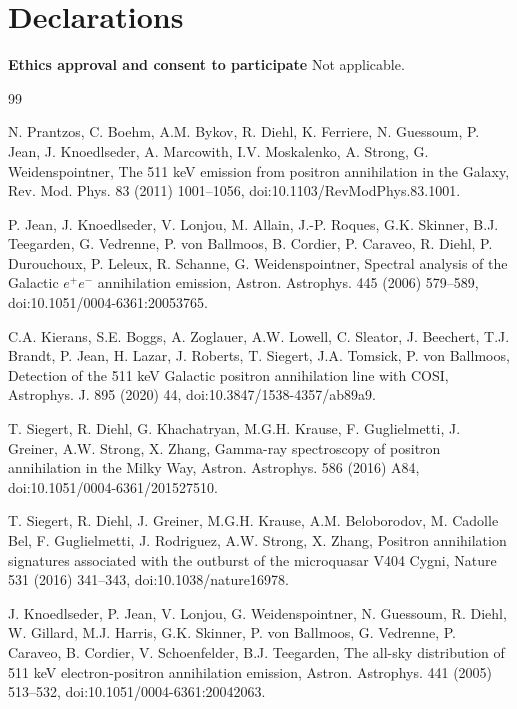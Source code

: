 \documentclass[11pt]{article}
\begin{document}
\section*{Declarations}
\textbf{Ethics approval and consent to participate} Not applicable.

\begin{thebibliography}{99}

N. Prantzos, C. Boehm, A.M. Bykov, R. Diehl, K. Ferriere, N. Guessoum, P. Jean, J. Knoedlseder, A. Marcowith, I.V. Moskalenko, A. Strong, G. Weidenspointner, The 511 keV emission from positron annihilation in the Galaxy, Rev. Mod. Phys. 83 (2011) 1001--1056, doi:10.1103/RevModPhys.83.1001.

P. Jean, J. Knoedlseder, V. Lonjou, M. Allain, J.-P. Roques, G.K. Skinner, B.J. Teegarden, G. Vedrenne, P. von Ballmoos, B. Cordier, P. Caraveo, R. Diehl, P. Durouchoux, P. Leleux, R. Schanne, G. Weidenspointner, Spectral analysis of the Galactic $e^+e^-$ annihilation emission, Astron. Astrophys. 445 (2006) 579--589, doi:10.1051/0004-6361:20053765.

C.A. Kierans, S.E. Boggs, A. Zoglauer, A.W. Lowell, C. Sleator, J. Beechert, T.J. Brandt, P. Jean, H. Lazar, J. Roberts, T. Siegert, J.A. Tomsick, P. von Ballmoos, Detection of the 511 keV Galactic positron annihilation line with COSI, Astrophys. J. 895 (2020) 44, doi:10.3847/1538-4357/ab89a9.

T. Siegert, R. Diehl, G. Khachatryan, M.G.H. Krause, F. Guglielmetti, J. Greiner, A.W. Strong, X. Zhang, Gamma-ray spectroscopy of positron annihilation in the Milky Way, Astron. Astrophys. 586 (2016) A84, doi:10.1051/0004-6361/201527510.

T. Siegert, R. Diehl, J. Greiner, M.G.H. Krause, A.M. Beloborodov, M. Cadolle Bel, F. Guglielmetti, J. Rodriguez, A.W. Strong, X. Zhang, Positron annihilation signatures associated with the outburst of the microquasar V404 Cygni, Nature 531 (2016) 341--343, doi:10.1038/nature16978.

J. Knoedlseder, P. Jean, V. Lonjou, G. Weidenspointner, N. Guessoum, R. Diehl, W. Gillard, M.J. Harris, G.K. Skinner, P. von Ballmoos, G. Vedrenne, P. Caraveo, B. Cordier, V. Schoenfelder, B.J. Teegarden, The all-sky distribution of 511 keV electron-positron annihilation emission, Astron. Astrophys. 441 (2005) 513--532, doi:10.1051/0004-6361:20042063.


\end{thebibliography}
\end{document}
